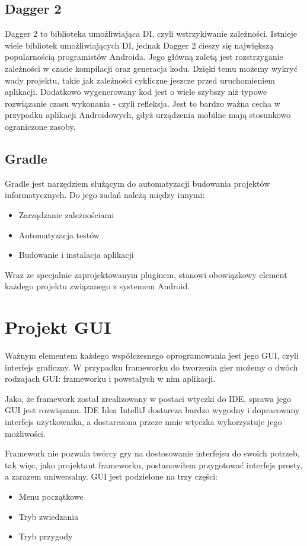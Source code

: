\documentclass	{xmgr}
\begin{document}
\section{Dagger 2}

Dagger 2 \cite{Dagger2:2017:Doc} to biblioteka umożliwiająca DI, czyli wstrzykiwanie zależności. Istnieje wiele bibliotek umożliwiających DI, jednak Dagger 2 cieszy się największą popularnością programistów Androida. Jego główną zaletą jest rozstrzyganie zależności w czasie kompilacji oraz generacja kodu. Dzięki temu możemy wykryć wady projektu, takie jak zależności cykliczne jeszcze przed uruchomieniem aplikacji. Dodatkowo wygenerowany kod jest o wiele szybszy niż typowe rozwiązanie czasu wykonania - czyli refleksja. Jest to bardzo ważna cecha w przypadku aplikacji Androidowych, gdyż urządzenia mobilne mają stosunkowo ograniczone zasoby. 

\section{Gradle}

Gradle \cite{Gradle:2017:Doc} jest narzędziem służącym do automatyzacji budowania projektów informatycznych. Do jego zadań należą między innymi:
\begin{itemize}
	\item Zarządzanie zależnościami
	\item Automatyzacja testów
	\item Budowanie i instalacja aplikacji
\end{itemize}
Wraz ze specjalnie zaprojektowanym pluginem, stanowi obowiązkowy element każdego projektu związanego z systemem Android.

\chapter{Projekt GUI}
Ważnym elementem każdego współczesnego oprogramowania jest jego GUI, czyli interfejs graficzny. W przypadku frameworku do tworzenia gier  możemy o dwóch rodzajach GUI: frameworku i powstałych w nim aplikacji. 

Jako, że framework został zrealizowany w postaci wtyczki do IDE, sprawa jego GUI jest rozwiązana. IDE Idea IntelliJ dostarcza bardzo wygodny i dopracowany interfejs użytkownika, a dostarczona przeze mnie wtyczka wykorzystuje jego możliwości. 

Framework nie pozwala twórcy gry na dostosowanie interfejsu do swoich potrzeb, tak więc, jako projektant frameworku, postanowiłem przygotować interfejs prosty, a zarazem uniwersalny. GUI jest podzielone na trzy części:
\begin{itemize}
	\item Menu początkowe
	\item Tryb zwiedzania
	\item Tryb przygody
\end{itemize}
\end{document}
